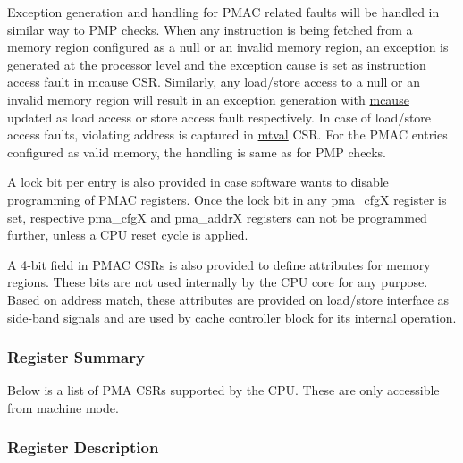 \documentclass[main\_\_EN.tex]{subfiles}
\begin{document}
Exception generation and handling for PMAC related faults will be handled in similar way to PMP checks. When any instruction is being fetched from a memory region configured as a null or an invalid memory region, an exception is generated at the processor level and the exception cause is set as instruction access fault in \hyperref[regdesc:MCAUSE]{mcause} CSR. Similarly, any load/store access to a null or an invalid memory region will result in an exception generation with \hyperref[regdesc:MCAUSE]{mcause} updated as load access or store access fault respectively. In case of load/store access faults, violating address is captured in \hyperref[regdesc:MTVAL]{mtval} CSR. For the PMAC entries configured as valid memory, the handling is same as for PMP checks.

A lock bit per entry is also provided in case software wants to disable programming of PMAC registers. Once the lock bit in any pma\_cfgX register is set, respective pma\_cfgX and pma\_addrX registers can not be programmed further, unless a CPU reset cycle is applied.

A 4-bit field in PMAC CSRs is also provided to define attributes for memory regions. These bits are not used internally by the CPU core for any purpose. Based on address match, these attributes are provided on load/store interface as side-band signals and are used by cache controller block for its internal operation.


\newpage
\hypertarget{riscvcpu-pma-reg-summ}{}
\subsubsection{Register Summary}
\label{sec:riscvcpu-pma-reg-summ}


Below is a list of PMA CSRs supported by the CPU. These are only accessible from machine mode.




\subsubsection{Register Description}
\label{sec:riscvcpu-pma-reg-desc}



\newpage
\end{document}
